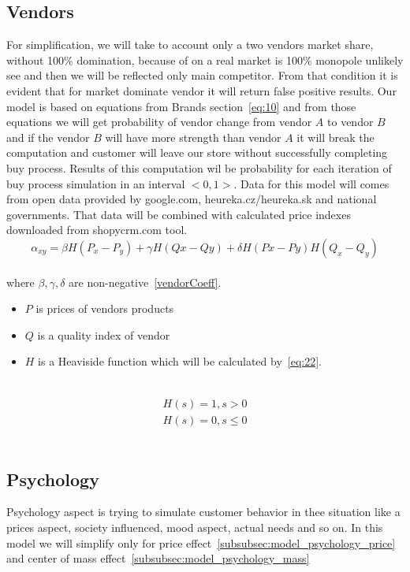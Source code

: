 \subsection{Vendors} \label{subsec:model_vendors}
For simplification, we will take to account only a two vendors market share, without 100\% domination, because of on a real
market is 100\% monopole unlikely see and then we will be reflected only main competitor.
From that condition it is evident that for market dominate vendor it will return false positive results.
Our model is based on equations from Brands section~\ref{eq:10} and from those equations we will get probability of vendor change from
vendor $A$ to vendor $B$ and if the vendor $B$ will have more strength than vendor $A$ it will break the computation and customer
will leave our store without successfully completing buy process.
Results of this computation wil be probability for each iteration of buy process simulation in an interval $<0,1>$.
Data for this model will comes from open data provided by google.com, heureka.cz/heureka.sk and national governments.
That data will be combined with calculated price indexes downloaded from shopycrm.com tool.
\\
\begin{equation} \label{eq:24}
\alpha_{xy} = \beta H(P_x-P_y) + \gamma H(Qx-Qy) + \delta H(Px-Py)H(Q_x - Q_y)
\end{equation}
\\
where $\beta, \gamma, \delta$ are non-negative~\ref{vendorCoeff}.
\\
\begin{itemize}
    \item $P$ is prices of vendors products
    \item $Q$ is a quality index of vendor
    \item $H$ is a Heaviside function which will be calculated by~\ref{eq:22}.
\end{itemize}
\\
\begin{eqnarray} \label{eq:25}
H(s) = 1, s > 0 \\
H (s) = 0, s \leq 0
\end{eqnarray}
\\
\subsection{Psychology} \label{subsec:model_psychology}
Psychology aspect is trying to simulate customer behavior in thee situation like a prices aspect, society influenced, mood aspect, actual needs
and so on.
In this model we will simplify only for price effect~\ref{subsubsec:model_psychology_price} and center of mass effect~\ref{subsubsec:model_psychology_mass}

